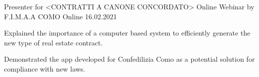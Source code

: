 
\begin{cventries}

  \cventry
  {Presenter for <CONTRATTI A CANONE CONCORDATO>}
  {Online Webinar by F.I.M.A.A COMO}
  {Online}
  {16.02.2021}
  {
    \begin{cvitems}
      \item {Explained the importance of a computer based system to efficiently generate the new type of real estate contract.}
      \item {Demonstrated the app developed for Confedilizia Como as a potential solution for compliance with new laws.}
    \end{cvitems}
  }

\end{cventries}